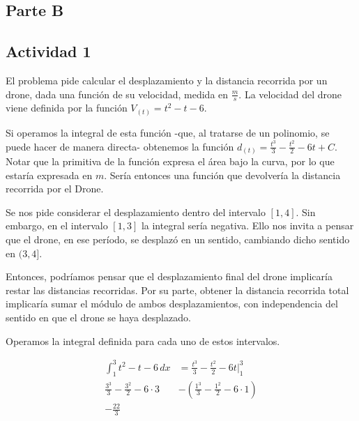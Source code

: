 \subsection*{Parte B}

\subsection*{Actividad 1}

El problema pide calcular el desplazamiento y la distancia recorrida por un drone, dada una función de su velocidad, medida en $\frac{m}{s}$. La velocidad del drone viene definida por la función $V_{(t)} = t^2 - t - 6$. 

\begin{center}
\end{center}

Si operamos la integral de esta función -que, al tratarse de un polinomio, se puede hacer de manera directa- obtenemos la función $d_{(t)} = \frac{t^3}{3} - \frac{t^2}{2} - 6t + C$. Notar que la primitiva de la función expresa el área bajo la curva, por lo que estaría expresada en $m$. Sería entonces una función que devolvería la distancia recorrida por el Drone.

Se nos pide considerar el desplazamiento dentro del intervalo $[1, 4]$. Sin embargo, en el intervalo $[1, 3]$ la integral sería negativa. Ello nos invita a pensar que el drone, en ese período, se desplazó en un sentido, cambiando dicho sentido en $(3, 4]$. 

Entonces, podríamos pensar que el desplazamiento final del drone implicaría restar las distancias recorridas. Por su parte, obtener la distancia recorrida total implicaría sumar el módulo de ambos desplazamientos, con independencia del sentido en que el drone se haya desplazado.

Operamos la integral definida para cada uno de estos intervalos.

\begin{align*}
    \int_{1}^{3} t^2 - t - 6 \,dx &= \frac{t^3}{3} - \frac{t^2}{2} - 6t \Big|_1^3\\
    \frac{3^3}{3} - \frac{3^2}{2} - 6 \cdot 3 &- \left( \frac{1^3}{3} - \frac{1^2}{2} - 6 \cdot 1 \right)\\
    - \frac{22}{3}
\end{align*}

